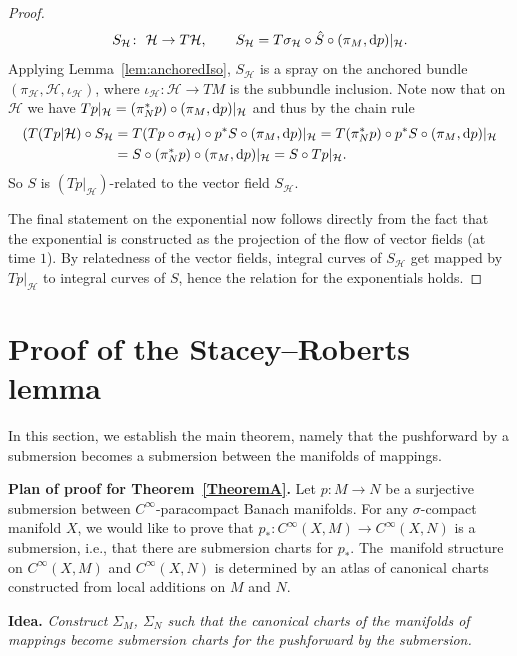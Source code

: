 \documentclass[pdftex]{sigma}
\numberwithin{equation}{section}
\newtheorem{setup}[Theorem]{}
\newcommand{\cH}{\ensuremath{\mathcal{H}}}
\begin{document}
\begin{proof}
\begin{displaymath}
 S_\cH \colon \ \cH \rightarrow T\cH,\qquad S_\cH = T\sigma_\cH \circ \hat{S} \circ (\pi_M, {\rm d}p)|_{\cH}.\end{displaymath}
Applying Lemma~\ref{lem:anchoredIso}, $S_{\cH}$ is a spray on the anchored bundle $(\pi_{\cH}, \cH, \iota_\cH)$, where $\iota_\cH \colon \cH \rightarrow TM$ is the subbundle inclusion.
Note now that on $\cH$ we have $Tp|_\cH = (\pi_N^\ast p) \circ (\pi_M,{\rm d}p)|_\cH$ and thus by the chain rule
\begin{align*}
(T(Tp|\cH) \circ S_\cH &= T(Tp \circ \sigma_\cH) \circ p^\ast S\circ (\pi_M, {\rm d}p)|_{\cH} = T(\pi_N^\ast p) \circ p^\ast S \circ (\pi_M, {\rm d}p)|_{\cH} \\
&= S \circ (\pi_N^\ast p) \circ (\pi_M, {\rm d}p)|_{\cH} = S \circ Tp|_{\cH}.
\end{align*}
So $S$ is $(Tp|_{\cH})$-related to the vector field $S_\cH$.

The final statement on the exponential now follows directly from the fact that the exponential is constructed as the projection of the flow of vector fields (at time $1$). By relatedness of the vector fields, integral curves of $S_\cH$ get mapped by $Tp|_{\cH}$ to integral curves of $S$, hence the relation for the exponentials holds.
\end{proof}

\section{Proof of the Stacey--Roberts lemma}

In this section, we establish the main theorem, namely that the pushforward by a submersion becomes a submersion between the manifolds of mappings.

{\bf Plan of proof for Theorem~\ref{TheoremA}.}\label{plan_of_attack}
Let $p \colon M \rightarrow N$ be a surjective submersion between $C^\infty$-paracompact Banach manifolds. For any $\sigma$-compact manifold $X$, we would like to prove that $p_\ast \colon C^\infty (X,M) \rightarrow C^\infty (X,N)$ is a submersion, i.e., that there are submersion charts for $p_\ast$.
The~manifold structure on $C^\infty (X,M)$ and $C^\infty (X,N)$ is determined by an atlas of canonical charts constructed from local additions on $M$ and $N$.

{\bf Idea.} \emph{Construct $\Sigma_M$, $\Sigma_N$ such that the canonical charts of the manifolds of mappings become submersion charts for the pushforward by the submersion.}
\end{document}

